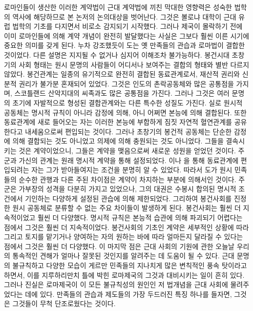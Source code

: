 로마인들이 생산한 이러한 계약법이
근대 계약법에 끼친 막대한 영향력은
성숙한 법학의 역사에 해당하므로
본 논저의 논의대상을 벗어난다.
그것은
볼로냐 대학이 근대 유럽 법학의 기초를 다지면서
비로소
감지되기 시작했다.
그러나
제국이 몰락하기 전에 이미
로마인들에 의해
계약 개념이
완전히 발달했다는 사실은
그보다 훨씬 이른 시기에
중요한 의미를 갖게 된다.
누차 강조했듯이
도는 옛 만족들의 관습과 로마법이
결합한 것이었다.
다른 설명은 지지될 수 없거나 심지어 이해조차 불가능하다.
봉건시대 초창기의 사회 형태는
원시 문명의 사람들이 어디서나 보여주는
결합의 형태와 별반 다르지 않았다.
봉건관계는 일종의 유기적으로 완전히 결합된 동료관계로서,
재산적 권리와 신분적 권리가 불가분 혼재되어 있었다.
그것은 인도의 촌락공동체와 많은 공통점을 가지며,
스코틀랜드 산악지대의 씨족과도 많은 공통점을 가진다.
그러나 그것은 여러 문명의 초기에 자발적으로 형성된 결합관계와는 다른
특수한 성질도 가진다.
실로 원시적 공동체는 명시적 규칙이 아니라 감정에 의해,
아니 어쩌면 본능에 의해 결합된다.
또한 동료관계에 새로 들어오는 자는
이러한 본능에 부합하게
짐짓
자연적 혈연관계를 공유한다고 내세움으로써 편입되는 것이다.
그러나 초창기의 봉건적 공동체는 단순한 감정에 의해
결합되는 것도 아니었고
의제에 의해 충원되는 것도 아니었다.
그들을 결속시키는 것은 계약이었으니,
그들은 계약을 맺음으로써 새로운 성원을 얻었던 것이다.
주군과 가신의 관계는 원래 명시적 계약을 통해 설정되었다.
이나
을 통해
동료관계에 편입되려는 자는
그가 받아들여지는 조건을 분명히 알 수 있었다.
따라서 도가 원시 민족들의 순수한 관행과 다른
주된 차이점은 계약이 차지하는 부분에 의해서인 것이다.
주군은 가부장의 성격을 다분히 가지고 있었으나,
그의 대권은
수봉시 합의된 명시적 조건에서 기인하는 다양하게 설정된 관습에 의해
제한되었다.
그리하여 봉건사회를 진정한 원시 공동체로 분류할 수 없는
주요 차이들이 발생하게 된다.
봉건사회는 훨씬 더 지속적이었고 훨씬 더 다양했다.
명시적 규칙은 본능적 습관에 의해 파괴되기 어렵다는 점에서
그것은
훨씬 더 지속적이었다.
봉건사회의 기초인 계약은
세부적인 상황에 따라
그리고
토지를 맡기거나 양여하는 자의 원하는 바에 따라
얼마든지 달라질 수 있다는 점에서
그것은
훨씬 더 다양했다.
이 마지막 점은
근대 사회의 기원에 관한 오늘날 우리의 통속적인 견해가
얼마나 잘못된 것인지를 알려주는 데 도움이 될 수 있다.
근대 문명의 불규칙하고 다양한 모습이
게르만 민족들의 지나치게 많은 변칙적인 풍속 탓이라고 하면서,
이를 지루하리만치 틀에 박힌 로마제국의 그것과 대비시키는 일이 흔히 있다.
그러나 진실은
로마제국이 이 모든 불규칙성의 원인인 저 법개념을
근대 사회에 물려주었다는 데에 있다.
만족들의 관습과 제도들의 가장 두드러진 특징 하나를 들자면,
그것은
그것들이 무척 단조로웠다는 것이다.

